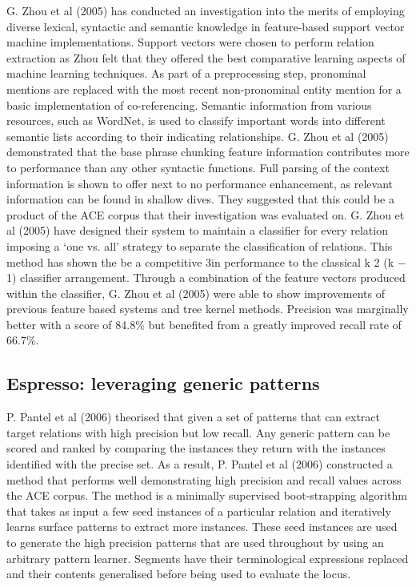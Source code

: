 \documentclass[11pt]{article} %
\begin{document}
G. Zhou et al (2005) has conducted an investigation into the merits of employing diverse lexical, syntactic and semantic knowledge in feature-based support vector machine implementations. Support vectors were chosen to perform relation extraction as Zhou felt that they offered the best comparative learning aspects of machine learning techniques. As part of a preprocessing step, pronominal mentions are replaced with the most recent non-pronominal entity mention for a basic implementation of co-referencing. Semantic information from various resources, such as WordNet, is used to classify important words into different semantic lists according to their indicating relationships. G. Zhou et al (2005) demonstrated that the base phrase chunking feature information contributes more to performance than any other syntactic functions. Full parsing of the context information is shown to offer next to no performance enhancement, as relevant information can be found in shallow dives. They suggested that this could be a product of the ACE corpus that their investigation was evaluated on. G. Zhou et al (2005) have designed their system to maintain a classifier for every relation imposing a ‘one vs. all’ strategy to separate the classification of relations. This method has shown the be a competitive 3in performance to the classical k 2 (k − 1) classifier arrangement. Through a combination of the feature vectors produced within the classifier, G. Zhou et al (2005) were able to show improvements of previous feature based systems and tree kernel methods. Precision was marginally better with a score of 84.8\% but benefited from a greatly improved recall rate of 66.7\%.

\subsection{Espresso: leveraging generic patterns}

P. Pantel et al (2006) theorised that given a set of patterns that can extract target relations with high precision but low recall. Any generic pattern can be scored and ranked by comparing the instances they return with the instances identified with the precise set. As a result, P. Pantel et al (2006) constructed a method that performs well demonstrating high precision and recall values across the ACE corpus. The method is a minimally supervised boot-strapping algorithm that takes as input a few seed instances of a particular relation and iteratively learns surface patterns to extract more instances. These seed instances are used to generate the high precision patterns that are used throughout by using an arbitrary pattern learner. Segments have their terminological expressions replaced and their contents generalised before being used to evaluate the locus.
\end{document}

